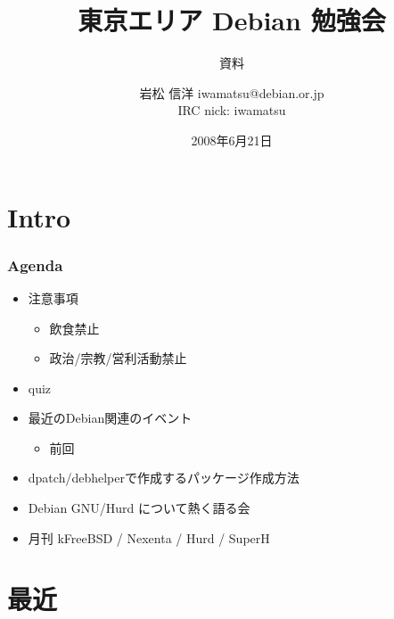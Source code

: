 \documentclass[cjk,dvipdfmx,12pt]{beamer}
\title{東京エリア Debian 勉強会}
\subtitle{資料}
\author{岩松 信洋 iwamatsu@debian.or.jp\\IRC nick: iwamatsu}
\date{2008年6月21日}
\begin{document}
\frame{\titlepage{}}


\section{Intro}


\begin{frame}
 \frametitle{Agenda}
\begin{minipage}[t]{0.45\hsize}
  \begin{itemize}
  \item 注意事項
	\begin{itemize}
	 \item 飲食禁止
	 \item 政治/宗教/営利活動禁止
	\end{itemize}
  \item quiz
  \item 最近のDebian関連のイベント
	\begin{itemize}
	 \item 前回 
	\end{itemize}
 \end{itemize}
\end{minipage} 
\begin{minipage}[t]{0.45\hsize}
 \begin{itemize}
  \item dpatch/debhelperで作成するパッケージ作成方法
  \item Debian GNU/Hurd について熱く語る会
  \item 月刊 kFreeBSD / Nexenta / Hurd / SuperH
 \end{itemize}
\end{minipage}
\end{frame}

\section{最近}
\end{document}
